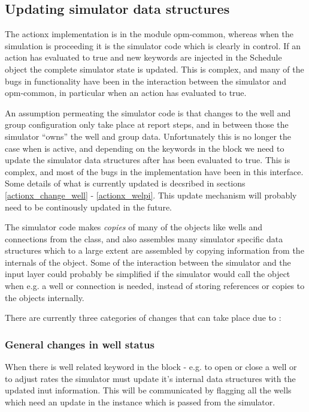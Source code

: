 \subsection{Updating simulator data structures}
The actionx implementation is in the module opm-common, whereas when the
simulation is proceeding it is the simulator code which is clearly in control.
If an action has evaluated to true and new keywords are injected in the Schedule
object the complete simulator state is updated. This is complex, and many of the
bugs in \actionx{} functionality have been in the interaction between the
simulator and opm-common, in particular when an action has evaluated to true.

An assumption permeating the simulator code is that changes to the well and
group configuration only take place at report steps, and in between those the
simulator ``owns'' the well and group data. Unfortunately this is no longer the
case when \actionx{} is active, and depending on the keywords in the \actionx{}
block we need to update the simulator data structures after \actionx{} has been
evaluated to true. This is complex, and most of the bugs in the \actionx{}
implementation have been in this interface. Some details of what is currently
updated is decsribed in sections \ref{actionx_change_well} -
\ref{actionx_welpi}. This update mechanism will probably need to be continously
updated in the future.

The simulator code makes \emph{copies} of many of the objects like wells and
connections from the  class, and also assembles many
simulator specific data structures which to a large extent are assembled by
copying information from the internals of the  object. Some
of the interaction between the simulator and the input layer could probably be
simplified if the simulator would call the  object when
e.g. a well or connection is needed, instead of storing references or copies to
the  objects internally.

There are currently three categories of changes that can take place due to
\actionx{}:


\subsubsection{General changes in well status}
When there is well related keyword in the \actionx{} block - e.g. 
to open or close a well or  to adjust rates the simulator must
update it's internal data structures with the updated inut information. This
will be communicated by flagging all the wells which need an update in the
 instance which is passed from the
simulator.



